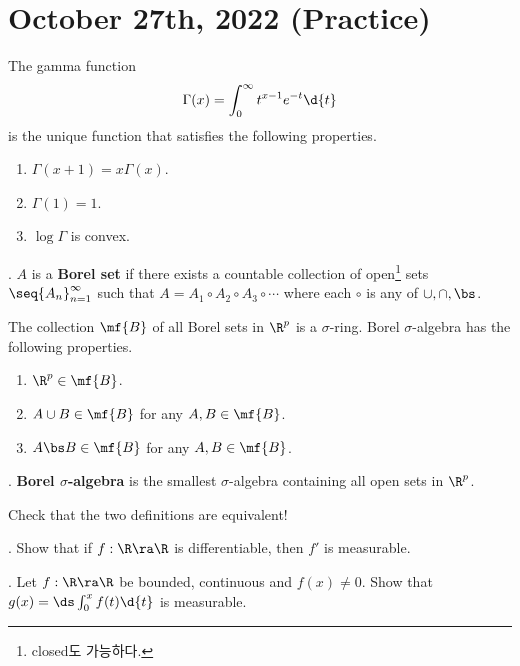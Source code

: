 \section*{October 27th, 2022 (Practice)}

The gamma function
\[
    \Gamma(x) = \int_{0}^{\infty} t^{x-1}e^{-t} \d{t}
\]
is the unique function that satisfies the following properties.
\begin{enumerate}
    \item \(\Gamma(x + 1) = x \Gamma(x)\).
    \item \(\Gamma(1) = 1\).
    \item \(\log \Gamma\) is convex.
\end{enumerate}

\bigskip

.  \(A\) is a \textbf{Borel set} if there exists a countable collection of open\footnote{closed도 가능하다.} sets \(\seq{A_n}_{n=1}^\infty\) such that \(A = A_1 \circ A_2 \circ A_3 \circ \cdots\) where each \(\circ\) is any of \(\cup, \cap, \bs\).

The collection \(\mf{B}\) of all Borel sets in \(\R^p\) is a \(\sigma\)-ring. Borel \(\sigma\)-algebra has the following properties.
\begin{enumerate}
    \item \(\R^p \in \mf{B}\).
    \item \(A\cup B \in \mf{B}\) for any \(A, B \in \mf{B}\).
    \item \(A \bs B \in \mf{B}\) for any \(A, B \in \mf{B}\).
\end{enumerate}

.  \textbf{Borel \(\sigma\)-algebra} is the smallest \(\sigma\)-algebra containing all open sets in \(\R^p\).

Check that the two definitions are equivalent!

\bigskip

\prob. Show that if \(f:\R \ra \R\) is differentiable, then \(f'\) is measurable.

\prob. Let \(f: \R \ra \R\) be bounded, continuous and \(f(x) \neq 0\). Show that \(g(x) = \ds\int_0^x f(t) \d{t}\) is measurable.
\pagebreak
